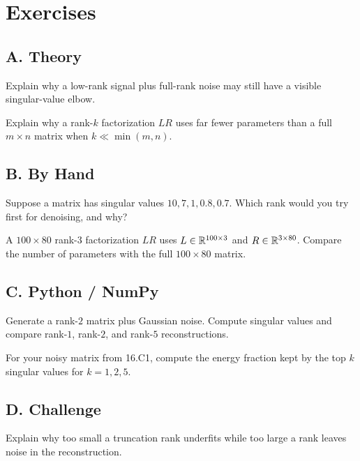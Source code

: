 \section*{Exercises}

\subsection*{A. Theory}

\begin{exercise}
Explain why a low-rank signal plus full-rank noise may still have a visible
singular-value elbow.
\end{exercise}

\begin{exercise}
Explain why a rank-$k$ factorization $LR$ uses far fewer parameters than a full
$m\times n$ matrix when $k\ll \min(m,n)$.
\end{exercise}

\subsection*{B. By Hand}

\begin{exercise}
Suppose a matrix has singular values $10,7,1,0.8,0.7$. Which rank would you try
first for denoising, and why?
\end{exercise}

\begin{exercise}
A $100\times 80$ rank-$3$ factorization $LR$ uses
$L\in\mathbb{R}^{100\times 3}$ and $R\in\mathbb{R}^{3\times 80}$. Compare the number of
parameters with the full $100\times 80$ matrix.
\end{exercise}

\subsection*{C. Python / NumPy}

\begin{exercise}
Generate a rank-$2$ matrix plus Gaussian noise. Compute singular values and
compare rank-$1$, rank-$2$, and rank-$5$ reconstructions.
\end{exercise}

\begin{exercise}
For your noisy matrix from 16.C1, compute the energy fraction kept by the top
$k$ singular values for $k=1,2,5$.
\end{exercise}

\subsection*{D. Challenge}

\begin{exercise}
Explain why too small a truncation rank underfits while too large a rank leaves
noise in the reconstruction.
\end{exercise}
